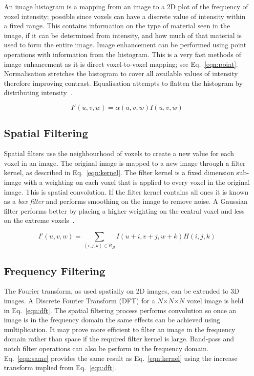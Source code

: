 \documentclass[journal]{IEEEtran}
\begin{document}
An image histogram is a mapping from an image to a 2D plot of the frequency of voxel intensity; possible since voxels can have a discrete value of intensity within a fixed range.
This contains information on the type of material seen in the image, if it can be determined from intensity, and how much of that material is used to form the entire image.
Image enhancement can be performed using point operations with information from the histogram.
This is a very fast methods of image enhancement as it is direct voxel-to-voxel mapping; see Eq.~\ref{eqn:point}. 
Normalisation stretches the histogram to cover all available values of intensity therefore improving contrast.
Equalisation attempts to flatten the histogram by distributing intensity~\cite{nixon02feature}.

\begin{equation}
	I'(u,v,w) = \alpha(u,v,w)I(u,v,w)
	\label{eqn:point} 
\end{equation}



\subsection{Spatial Filtering}
Spatial filters use the neighbourhood of voxels to create a new value for each voxel in an image. 
The original image is mapped to a new image through a filter kernel, as described in Eq.~\ref{eqn:kernel}.
The filter kernel is a fixed dimension sub-image with a weighting on each voxel that is applied to every voxel in the original image.
This is spatial convolution.
If the filter kernel contains all ones it is known as a \emph{box filter} and performs smoothing on the image to remove noise.
A Gaussian filter performs better by placing a higher weighting on the central voxel and less on the extreme voxels~\cite{lohmann1998volumetric}.


\begin{equation}
	I'(u,v,w) = \sum\limits_{(i,j,k) \in R_H} I(u + i,v + j, w + k)H(i,j,k)
	\label{eqn:kernel} 
\end{equation}



\subsection{Frequency Filtering}
The Fourier transform, as used spatially on 2D images, can be extended to 3D images.
A Discrete Fourier Transform (DFT) for a $N$$\times$$N$$\times$$N$ voxel image is held in Eq.~\ref{eqn:dft}.
The spatial filtering process performs convolution so once an image is in the frequency domain the same effects can be achieved using multiplication.
It may prove more efficient to filter an image in the frequency domain rather than space if the required filter kernel is large.
Band-pass and notch filter operations can also be perform in the frequency domain.
Eq.~\eqref{eqn:same} provides the same result as Eq.~\eqref{eqn:kernel} using the increase transform implied from Eq.~\eqref{eqn:dft}. 
\end{document}
